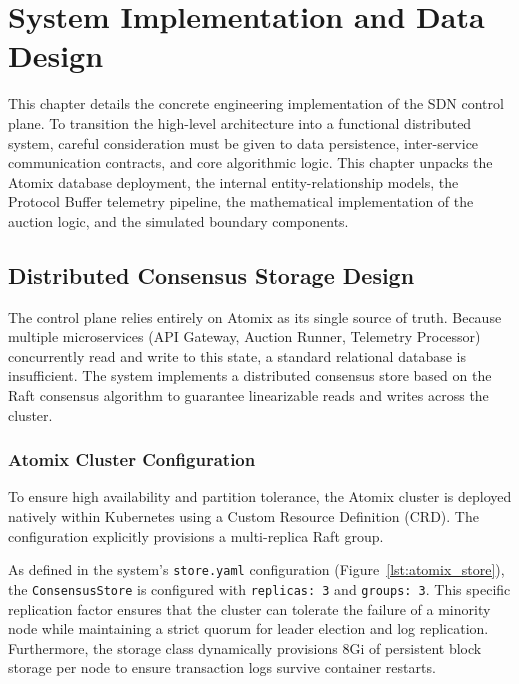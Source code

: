 
\chapter{System Implementation and Data Design}

This chapter details the concrete engineering implementation of the SDN control plane. To transition the high-level architecture into a functional distributed system, careful consideration must be given to data persistence, inter-service communication contracts, and core algorithmic logic. This chapter unpacks the Atomix database deployment, the internal entity-relationship models, the Protocol Buffer telemetry pipeline, the mathematical implementation of the auction logic, and the simulated boundary components.

\section{Distributed Consensus Storage Design}

The control plane relies entirely on Atomix as its single source of truth. Because multiple microservices (API Gateway, Auction Runner, Telemetry Processor) concurrently read and write to this state, a standard relational database is insufficient. The system implements a distributed consensus store based on the Raft consensus algorithm to guarantee linearizable reads and writes across the cluster.

\subsection{Atomix Cluster Configuration}
To ensure high availability and partition tolerance, the Atomix cluster is deployed natively within Kubernetes using a Custom Resource Definition (CRD). The configuration explicitly provisions a multi-replica Raft group. 

As defined in the system's \texttt{store.yaml} configuration (Figure~\ref{lst:atomix_store}), the \texttt{ConsensusStore} is configured with \texttt{replicas: 3} and \texttt{groups: 3}. This specific replication factor ensures that the cluster can tolerate the failure of a minority node while maintaining a strict quorum for leader election and log replication. Furthermore, the storage class dynamically provisions 8Gi of persistent block storage per node to ensure transaction logs survive container restarts.

